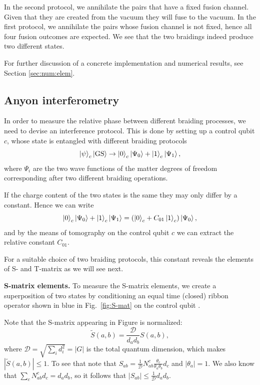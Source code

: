 \documentclass[two column]{article}
\begin{document}
In the second protocol, we annihilate the pairs that have a fixed fusion channel. Given that they are created from the vacuum they will fuse to the vacuum.
In the first protocol, we annihilate the pairs whose fusion channel is not fixed, hence all four fusion outcomes are expected. We see that the two braidings indeed produce two different states. 

For further discussion of a concrete implementation and numerical results, see Section \ref{sec:num:elem}.

\subsection{Anyon interferometry}\label{subsec:Intef}




In order to measure the relative phase between different braiding processes, we need to devise an interference protocol. This is done by setting up a control qubit $c$, whose state is entangled with different braiding protocols
\begin{equation}
    \ket{\psi}_c\ket{\text{GS}} \rightarrow \ket{0}_c \ket{\Psi_0} + \ket{1}_c \ket{\Psi_1},
\end{equation}
where $\Psi_i$ are the two wave functions of the matter degrees of freedom corresponding after two different braiding operations.

If the charge content of the two states is the same they may only differ by a constant. Hence we can write
\begin{equation}
    \ket{0}_c \ket{\Psi_0} + \ket{1}_c \ket{\Psi_1} = (\ket{0}_c + C_{01}\ket{1}_c)\ket{\Psi_0},
\end{equation}
and by the means of tomography on the control qubit $c$ we can extract the relative constant $C_{01}$.

For a suitable choice of two braiding protocols, this constant reveals the elements of S- and T-matrix as we will see next.

\textbf{S-matrix elements.}
To measure the S-matrix elements, we create a superposition of two states by conditioning an equal time (closed) ribbon operator shown in blue in Fig.~\ref{fig:S-mat} on the control qubit . 





Note that the S-matrix appearing in Figure is normalized:
\begin{equation}
    \tilde{S}(a,b) = \frac{\mathcal D}{d_a d_b}S(a,b),
\end{equation}
where $\mathcal D=\sqrt{\sum_i d_i^2}=|G|$ is the total quantum dimension,
which makes $|\tilde{S}(a,b)| \leq 1$. To see that note that $S_{ab}=\frac{1}{\mathcal D} N_{ab}^c \frac{\theta_c}{\theta_a \theta_b} d_c$ and $|\theta_a|=1$. We also know that $\sum_c N_{ab}^c d_c = d_a d_b$, so it follows that $|S_{ab}| \leq \frac{1}{\mathcal D} d_a d_b$.
\end{document}
